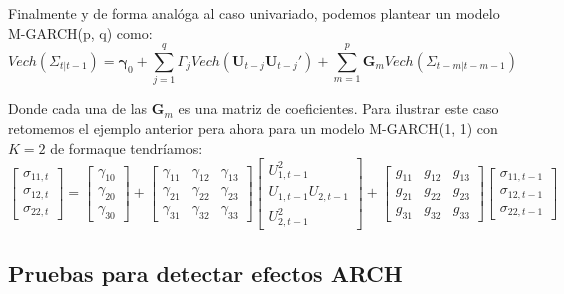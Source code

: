 \documentclass[
  a4paper,
]{article}
\begin{document}
Finalmente y de forma analóga al caso univariado, podemos plantear un
modelo M-GARCH(p, q) como: \[
    Vech(\Sigma_{t | t-1}) = \boldsymbol{\gamma}_0 + \sum_{j = 1}^q \Gamma_j Vech(\mathbf{U}_{t-j} \mathbf{U}_{t-j}') + \sum_{m = 1}^p \mathbf{G}_m Vech(\Sigma_{t-m | t-m-1})
    \label{M_GARCH}
\]

Donde cada una de las \(\mathbf{G}_m\) es una matriz de coeficientes.
Para ilustrar este caso retomemos el ejemplo anterior pera ahora para un
modelo M-GARCH(1, 1) con \(K = 2\) de formaque tendríamos:
\begin{equation*}
    \begin{bmatrix}
    \sigma_{11, t} \\ \sigma_{12, t} \\ \sigma_{22, t}
    \end{bmatrix} =
    \begin{bmatrix}
    \gamma_{10} \\ \gamma_{20} \\ \gamma_{30}
    \end{bmatrix} +
    \begin{bmatrix}
    \gamma_{11} & \gamma_{12} & \gamma_{13} \\ \gamma_{21} & \gamma_{22} & \gamma_{23} \\ \gamma_{31} & \gamma_{32} & \gamma_{33}
    \end{bmatrix} 
    \begin{bmatrix}
    U^2_{1, t-1} \\ U_{1, t-1} U_{2, t-1} \\ U^2_{2, t-1}
    \end{bmatrix} +
    \begin{bmatrix}
    g_{11} & g_{12} & g_{13} \\ g_{21} & g_{22} & g_{23} \\ g_{31} & g_{32} & g_{33}
    \end{bmatrix} 
    \begin{bmatrix}
    \sigma_{11, t-1} \\ \sigma_{12, t-1} \\ \sigma_{22, t-1}
    \end{bmatrix}
\end{equation*}

\subsection{Pruebas para detectar efectos
ARCH}\label{pruebas-para-detectar-efectos-arch}
\end{document}
